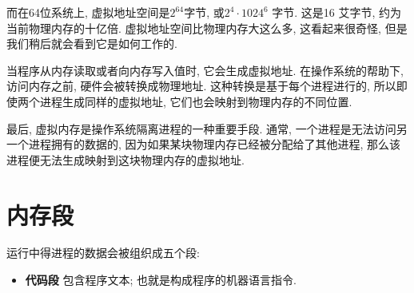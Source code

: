 \documentclass[12pt]{book}
\begin{document}
{%
%
%
而在64位系统上, 虚拟地址空间是$2^{64}$字节, 或$2^4 \cdot 1024^6$ 字节.
这是16 艾字节, 约为当前物理内存的十亿倍.
虚拟地址空间比物理内存大这么多, 这看起来很奇怪, 
但是我们稍后就会看到它是如何工作的.

当程序从内存读取或者向内存写入值时, 它会生成虚拟地址.
在操作系统的帮助下, 访问内存之前, 硬件会被转换成物理地址.
这种转换是基于每个进程进行的, 所以即使两个进程生成同样的虚拟地址,
它们也会映射到物理内存的不同位置.

最后, 虚拟内存是操作系统隔离进程的一种重要手段.
通常, 一个进程是无法访问另一个进程拥有的数据的, 
因为如果某块物理内存已经被分配给了其他进程,
那么该进程便无法生成映射到这块物理内存的虚拟地址.

\section{内存段}

运行中得进程的数据会被组织成五个段:

\begin{itemize}

\item {\bf 代码段} 包含程序文本; 也就是构成程序的机器语言指令.


\end{itemize}}
\end{document}
